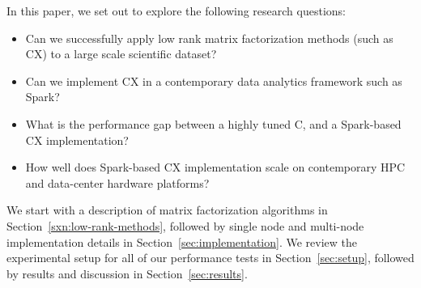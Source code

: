 In this paper, we set out to explore the following research questions:
\begin{itemize}
\item Can we successfully apply low rank matrix factorization methods (such as CX) to a large scale scientific dataset?

\item Can we implement CX in a contemporary data analytics framework such as Spark?

\item What is the performance gap between a highly tuned C, and a Spark-based CX implementation? 

\item How well does Spark-based CX implementation scale on contemporary HPC and data-center hardware platforms?
\end{itemize}

We start with a description of matrix factorization algorithms in Section~\ref{sxn:low-rank-methods}, followed by single node and multi-node implementation details in Section~\ref{sec:implementation}. We review the experimental setup for all of our performance tests in Section~\ref{sec:setup}, followed by results and discussion in Section~\ref{sec:results}.

